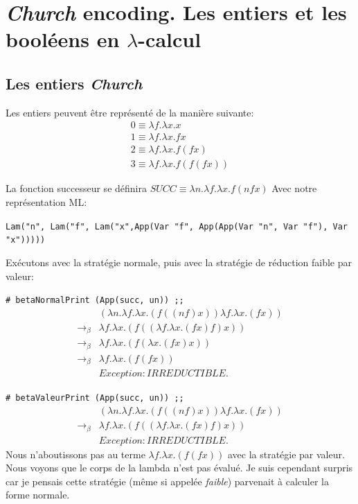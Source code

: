 \documentclass[11pt]{book}
\begin{document}
\section{\textit{Church} encoding. Les entiers et les booléens en $\lambda$-calcul}
\subsection{Les entiers \textit{Church} }
Les entiers peuvent être représenté de la manière suivante:
$$
\begin{array}{l}
0 \equiv \lambda f.\lambda x.x \\
1 \equiv \lambda f.\lambda x.f x \\
2 \equiv \lambda f.\lambda x.f (f x) \\
3 \equiv \lambda f.\lambda x.f (f (f x)) 
\end{array}
$$

La fonction successeur se définira $SUCC \equiv \lambda n.\lambda f.\lambda x.f (n f x)$
Avec notre représentation ML: 

\verb+Lam("n", Lam("f", Lam("x",App(Var "f", App(App(Var "n", Var "f"), Var "x")))))+

Exécutons avec la stratégie normale, puis avec la stratégie de réduction faible par valeur:


\verb+# betaNormalPrint (App(succ, un)) ;;+
$$
\begin{array}{ll}
& (\lambda n . \lambda f . \lambda x . (f((nf)x))\lambda f . \lambda x . (fx))   \\
\rightarrow _\beta & \lambda f . \lambda x . (f((\lambda f . \lambda x . (fx)f)x))   \\
\rightarrow _\beta & \lambda f . \lambda x . (f(\lambda x . (fx)x))   \\
\rightarrow _\beta & \lambda f . \lambda x . (f(fx))   \\
& Exception: IRREDUCTIBLE.
\end{array}
$$

\verb+# betaValeurPrint (App(succ, un)) ;;+
$$
\begin{array}{ll}
& (\lambda n . \lambda f . \lambda x . (f((nf)x))\lambda f . \lambda x . (fx))   \\
\rightarrow _\beta & \lambda f . \lambda x . (f((\lambda f . \lambda x . (fx)f)x))   \\
& Exception: IRREDUCTIBLE.
\end{array} 
$$
Nous n'aboutissons pas au terme $\lambda f . \lambda x . (f(fx)) $ avec la stratégie par valeur. Nous voyons que le corps de la lambda
n'est pas évalué. Je suis cependant surpris car je pensais cette stratégie (même si appelée \textit{faible}) parvenait à calculer la
forme normale.
\end{document}
